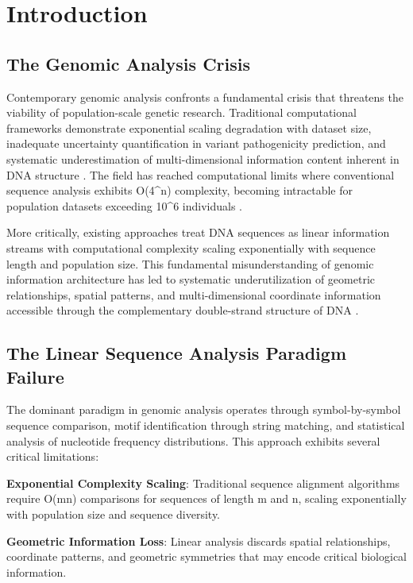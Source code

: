 \documentclass[12pt,a4paper]{article}
\begin{document}
\section{Introduction}

\subsection{The Genomic Analysis Crisis}

Contemporary genomic analysis confronts a fundamental crisis that threatens the viability of population-scale genetic research. Traditional computational frameworks demonstrate exponential scaling degradation with dataset size, inadequate uncertainty quantification in variant pathogenicity prediction, and systematic underestimation of multi-dimensional information content inherent in DNA structure \cite{li2009sequence, mckenna2010genome}. The field has reached computational limits where conventional sequence analysis exhibits O(4^n) complexity, becoming intractable for population datasets exceeding 10^6 individuals \cite{landrum2018clinvar}.

More critically, existing approaches treat DNA sequences as linear information streams with computational complexity scaling exponentially with sequence length and population size. This fundamental misunderstanding of genomic information architecture has led to systematic underutilization of geometric relationships, spatial patterns, and multi-dimensional coordinate information accessible through the complementary double-strand structure of DNA \cite{watson1953molecular}.

\subsection{The Linear Sequence Analysis Paradigm Failure}

The dominant paradigm in genomic analysis operates through symbol-by-symbol sequence comparison, motif identification through string matching, and statistical analysis of nucleotide frequency distributions. This approach exhibits several critical limitations:

\textbf{Exponential Complexity Scaling}: Traditional sequence alignment algorithms require O(mn) comparisons for sequences of length m and n, scaling exponentially with population size and sequence diversity.

\textbf{Geometric Information Loss}: Linear analysis discards spatial relationships, coordinate patterns, and geometric symmetries that may encode critical biological information.
\end{document}
